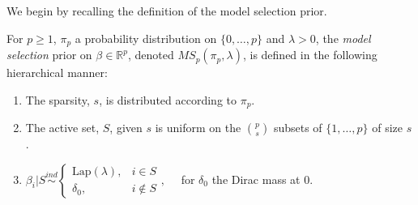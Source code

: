 \documentclass[11pt]{article}
\newcommand{\R}{\mathbb{R}}
\numberwithin{equation}{section}
\begin{document}

We begin by recalling the definition of the model selection prior.
\begin{definition}\label{model_selection_prior}
 For $p\geq 1$, $\pi_p$ a probability distribution on $\{0, \dots, p\}$ and $\lambda > 0$, the \textit{model selection} prior on $\beta \in \R^p$, denoted $MS_p(\pi_p, \lambda)$, is defined in the following hierarchical manner:
 	\begin{enumerate}
 		\item The sparsity, $s$, is distributed according to $\pi_p$.
 		\item The active set, $S$, given $s$ is uniform on the ${p}\choose {s}$ subsets of $\{1,\dots,p\}$ of size $s$.
 		\item $\beta_i | S \overset{ind}{\sim} \begin{cases}
 			\text{Lap}(\lambda),& i \in S \\
 			\delta_0,& i \notin S
 		\end{cases},\quad$  for $\delta_0$ the Dirac mass at 0.
 	\end{enumerate}
\end{definition}
\end{document}
